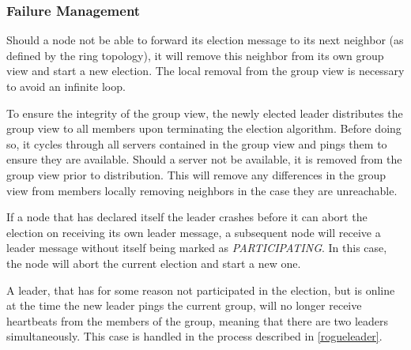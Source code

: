 \documentclass[runningheads]{llncs}
\begin{document}
\subsubsection{Failure Management}

Should a node not be able to forward its election message to its next neighbor (as defined by the ring topology), it will remove this neighbor from its own group view and start a new election. The local removal from the group view is necessary to avoid an infinite loop.

To ensure the integrity of the group view, the newly elected leader distributes the group view to all members upon terminating the election algorithm. Before doing so, it cycles through all servers contained in the group view and pings them to ensure they are available. Should a server not be available, it is removed from the group view prior to distribution. This will remove any differences in the group view from members locally removing neighbors in the case they are unreachable.

If a node that has declared itself the leader crashes before it can abort the election on receiving its own leader message, a subsequent node will receive a leader message without itself being marked as \textit{PARTICIPATING}. In this case, the node will abort the current election and start a new one.

A leader, that has for some reason not participated in the election, but is online at the time the new leader pings the current group, will no longer receive heartbeats from the members of the group, meaning that there are two leaders simultaneously. This case is handled in the process described in \ref{rogueleader}.
\end{document}
